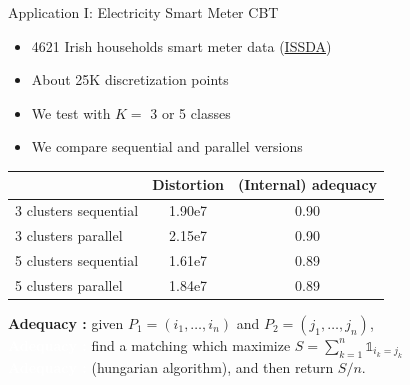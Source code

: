 \begin{frame}{Application I: Electricity Smart Meter CBT}


\begin{itemize}
 \item 4621 Irish households smart meter data 
 (\href{http://www.ucd.ie/issda/data/}{ISSDA})
 \item About 25K discretization points 
 \item We test with $K=$ 3 or 5 classes
 \item We compare sequential and parallel versions 
\end{itemize}

\begin{table}[H]
\centering
\begin{tabular}{lcc}                       \hline
 & Distortion & (Internal) adequacy  \\ \hline
3 clusters sequential & 1.90e7 & 0.90   \\
3 clusters parallel   & 2.15e7 & 0.90   \\
5 clusters sequential & 1.61e7 & 0.89   \\
5 clusters parallel   & 1.84e7 & 0.89   \\ \hline
\end{tabular}
\end{table}

\textbf{Adequacy :} given $P_1 = (i_1,\dots,i_n)$ and $P_2 = (j_1,\dots,j_n)$,\\
\textcolor{white}{\textbf{Adequacy :}} find a matching which maximize $S = \sum_{k=1}^{n} \mathbb{1}_{i_k = j_k}$\\
\textcolor{white}{\textbf{Adequacy :}} (hungarian algorithm), and then return $S/n$.

\end{frame}

